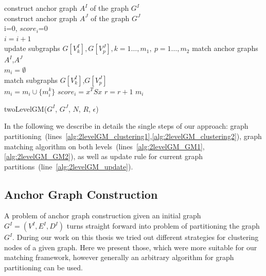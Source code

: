 \begin{algorithm}[h]
	construct anchor graph $A^I$ of the graph $G^I$ \label{alg:2levelGM_clustering1}\\
	construct anchor graph $A^J$ of the graph $G^J$ \label{alg:2levelGM_clustering2}\\
	i=0, $score_i$=0\\
	{ $i=i+1$ \\
	  {update subgraphs $G[V^I_k],G[V^J_p],k=1\dots,m_1,\ p=1\dots,m_2$ \label{alg:2levelGM_update}}
	  match anchor graphs $A^I$,$A^J$ \label{alg:2levelGM_GM1} \\
	  $m_i=\emptyset$\\
	  {match subgraphs $G[V^I_k]$,$G[V^J_p]$ \label{alg:2levelGM_GM2}\\
	   $m_i=m_i\cup\{m^k_i\}$\hspace{55pt}
	  }
	  $score_i=x^TSx$ \hspace{5pt}
	  {$r=r+1$}
	}
	\Return $m_i$
	\caption{twoLevelGM($G^I$, $G^J$, $N$, $R$, $\epsilon$)} \label{alg:2levelGM}
\end{algorithm}

In the following we describe in details the single steps of our approach: %
graph partitioning~(lines~\ref{alg:2levelGM_clustering1},\ref{alg:2levelGM_clustering2}), graph matching algorithm on both levels~(lines~\ref{alg:2levelGM_GM1},\ref{alg:2levelGM_GM2}), as well as update rule for current graph partitions~(line~\ref{alg:2levelGM_update}).
\subsection{Anchor Graph Construction}
A problem of anchor graph construction given  an initial graph $G^I=(V^I,E^I,D^I)$ turns straight forward into problem of partitioning the graph $G^I$. During our work on this thesis we tried out different strategies for clustering nodes of a given graph. Here we present those, which were more suitable for our matching framework, however generally an arbitrary algorithm for graph partitioning can be used.

